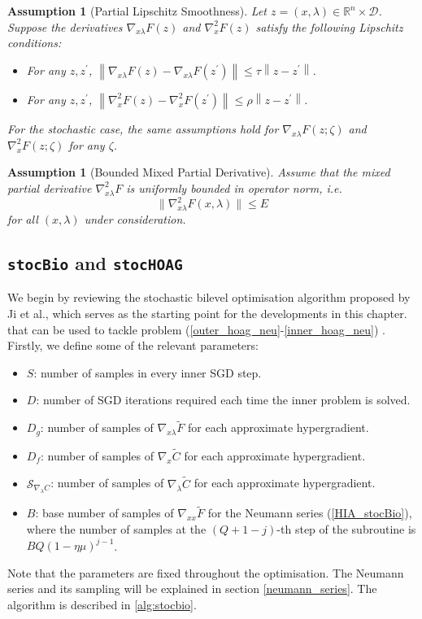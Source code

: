 \documentclass[11pt, twoside]{report}
\newtheorem{assumption}[theorem]{Assumption}
\begin{document}

\begin{assumption}[Partial Lipschitz Smoothness] \label{pls_ass}
Let $z = (x,\lambda) \in \mathbb{R}^{n} \times \mathcal{D}$. Suppose the derivatives $\nabla_{x\lambda} F(z)$ and $\nabla_x^2 F(z)$ satisfy the following Lipschitz conditions:
\begin{itemize}
    \item For any $z, z^{\prime}$, $\left\|\nabla_{x\lambda} F(z)-\nabla_{x\lambda} F(z^{\prime})\right\| \leq \tau\left\|z-z^{\prime}\right\|$.
    \item For any $z, z^{\prime}$, $\left\|\nabla_x^2 F(z)-\nabla_x^2 F\left(z^{\prime}\right)\right\| \leq \rho\left\|z-z^{\prime}\right\|$.
\end{itemize}
For the stochastic case, the same assumptions hold for $\nabla_{x\lambda} F(z; \zeta)$ and $\nabla_x^2 F(z ; \zeta)$ for any $\zeta$.
\end{assumption}

\begin{assumption}[Bounded Mixed Partial Derivative]
\label{nablaFxl_bnd}
Assume that the mixed partial derivative $\nabla_{x\lambda}^2F$ is uniformly bounded in operator norm, i.e.
\[
\|\nabla_{x\lambda}^2F(x,\lambda)\|\le E
\]
for all $(x,\lambda)$ under consideration.
\end{assumption}

\subsection{\texttt{stocBio} and \texttt{stocHOAG}}
We begin by reviewing the stochastic bilevel optimisation algorithm proposed by Ji et al., which serves as the starting point for the developments in this chapter. that can be used to tackle problem (\ref{outer_hoag_neu}-\ref{inner_hoag_neu}) \cite{ji2021bilevel}. Firstly, we define some of the relevant parameters:
\begin{itemize}
    \item $S$: number of samples in every inner SGD step.
    \item $D$: number of SGD iterations required each time the inner problem is solved.
    \item $D_g$: number of samples of $\nabla_{x\lambda} \tilde{F}$ for each approximate hypergradient.
    \item $D_f$: number of samples of $\nabla_x \tilde{C}$ for each approximate hypergradient.
    \item $\mathcal{S}_{\nabla_\lambda C}$: number of samples of $\nabla_{\lambda} \tilde{C}$ for each approximate hypergradient.
    \item $B$: base number of samples of $\nabla_{xx} \tilde{F}$ for the Neumann series (\ref{HIA_stocBio}), where the number of samples at the $(Q+1-j)$-th step of the subroutine is $BQ(1-\eta\mu)^{j-1}$.
\end{itemize}
Note that the parameters are fixed throughout the optimisation. The Neumann series and its sampling will be explained in section \ref{neumann_series}. The algorithm is described in \ref{alg:stocbio}.
\end{document}
